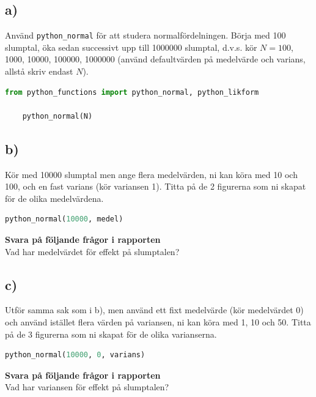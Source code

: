 \documentclass[a4paper]{article}
\begin{document}
\subsection{a)}
Använd \lstinline{python_normal} för att studera normalfördelningen. Börja med 100 slumptal,
öka sedan successivt upp till 1000000 slumptal, d.v.s. kör \( N=100 \), 1000, 10000,
100000, 1000000 (använd defaultvärden på medelvärde och varians, allstå skriv endast \( N \)).


\begin{lstlisting}[language=Python]
    from python_functions import python_normal, python_likform
    
    python_normal(N)
\end{lstlisting}

\subsection{b)}
Kör med 10000 slumptal men ange flera medelvärden, ni kan köra med 10 och 100,
och en fast varians (kör variansen 1). Titta på de 2 figurerna som ni skapat
för de olika medelvärdena.

\begin{lstlisting}[language=Python]
    python_normal(10000, medel)
\end{lstlisting}

\textbf{Svara på följande frågor i rapporten}\\
Vad har medelvärdet för effekt på slumptalen?

\subsection{c)}
Utför samma sak som i b), men använd ett fixt medelvärde (kör medelvärdet 0)
och använd istället flera värden på variansen, ni kan köra med 1, 10 och 50.
Titta på de 3 figurerna som ni skapat för de olika varianserna.

\begin{lstlisting}[language=Python]
    python_normal(10000, 0, varians)
\end{lstlisting}

\textbf{Svara på följande frågor i rapporten}\\
Vad har variansen för effekt på slumptalen?
\end{document}
